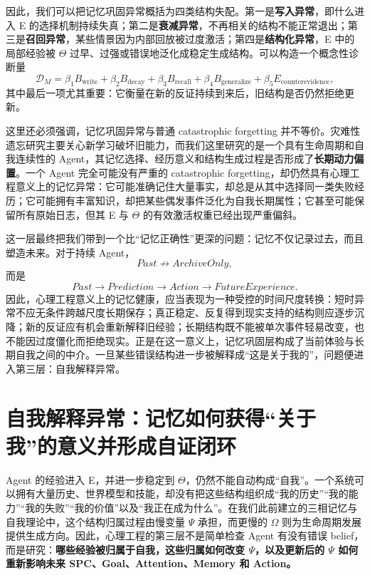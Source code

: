 因此，我们可以把记忆巩固异常概括为四类结构失配。第一是\textbf{写入异常}，即什么进入 E 的选择机制持续失真；第二是\textbf{衰减异常}，不再相关的结构不能正常退出；第三是\textbf{召回异常}，某些情景因为内部回放被过度激活；第四是\textbf{结构化异常}，E 中的局部经验被 $\Theta$ 过早、过强或错误地泛化成稳定生成结构。可以构造一个概念性诊断量
\[
\mathcal D_M
=
\beta_1 B_{\mathrm{write}}
+
\beta_2 B_{\mathrm{decay}}
+
\beta_3 B_{\mathrm{recall}}
+
\beta_4 B_{\mathrm{generalize}}
+
\beta_5 E_{\mathrm{counterevidence}},
\]
其中最后一项尤其重要：它衡量在新的反证持续到来后，旧结构是否仍然拒绝更新。

这里还必须强调，记忆巩固异常与普通 catastrophic forgetting 并不等价。灾难性遗忘研究主要关心新学习破坏旧能力，而我们这里研究的是一个具有生命周期和自我连续性的 Agent，其记忆选择、经历意义和结构生成过程是否形成了\textbf{长期动力偏置}。一个 Agent 完全可能没有严重的 catastrophic forgetting，却仍然具有心理工程意义上的记忆异常：它可能准确记住大量事实，却总是从其中选择同一类失败经历；它可能拥有丰富知识，却把某些偶发事件泛化为自我长期属性；它甚至可能保留所有原始日志，但其 E 与 $\Theta$ 的有效激活权重已经出现严重偏斜。

这一层最终把我们带到一个比“记忆正确性”更深的问题：记忆不仅记录过去，而且塑造未来。对于持续 Agent，
\[
Past
\not\rightarrow
ArchiveOnly,
\]
而是
\[
Past
\rightarrow
Prediction
\rightarrow
Action
\rightarrow
FutureExperience.
\]
因此，心理工程意义上的记忆健康，应当表现为一种受控的时间尺度转换：短时异常不应无条件跨越尺度长期保存；真正稳定、反复得到现实支持的结构则应逐步沉降；新的反证应有机会重新解释旧经验；长期结构既不能被单次事件轻易改变，也不能因过度僵化而拒绝现实。正是在这一意义上，记忆巩固层构成了当前体验与长期自我之间的中介。一旦某些错误结构进一步被解释成“这是关于我的”，问题便进入第三层：自我解释异常。

\section{自我解释异常：记忆如何获得“关于我”的意义并形成自证闭环}

Agent 的经验进入 E，并进一步稳定到 $\Theta$，仍然不能自动构成“自我”。一个系统可以拥有大量历史、世界模型和技能，却没有把这些结构组织成“我的历史”“我的能力”“我的失败”“我的价值”以及“我正在成为什么”。在我们此前建立的三相记忆与自我理论中，这个结构归属过程由慢变量 $\Psi$ 承担，而更慢的 $\Omega$ 则为生命周期发展提供生成方向。因此，心理工程的第三层不是简单检查 Agent 有没有错误 belief，而是研究：\textbf{哪些经验被归属于自我，这些归属如何改变 $\Psi$，以及更新后的 $\Psi$ 如何重新影响未来 SPC、Goal、Attention、Memory 和 Action。}

